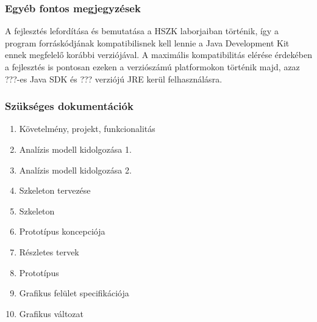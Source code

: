 %
   \subsubsection{Egyéb fontos megjegyzések}
	A fejlesztés lefordítása és bemutatása a HSZK laborjaiban történik, így a program forráskódjának kompatibilisnek kell lennie a Java Development Kit ennek megfelelő korábbi verziójával. A maximális kompatibilitás elérése érdekében a fejlesztés is pontosan ezeken a verziószámú platformokon történik majd, azaz ???-es Java SDK és ??? verziójú JRE kerül felhasználásra.

    \subsubsection{Szükséges dokumentációk}
	\begin{enumerate}
	\item Követelmény, projekt, funkcionalitás
	\item Analízis modell kidolgozása 1.
	\item Analízis modell kidolgozása 2.
	\item Szkeleton tervezése
	\item Szkeleton
	\item Prototípus koncepciója
	\item Részletes tervek
	\item Prototípus
	\item Grafikus felület specifikációja
	\item Grafikus változat
	\end{enumerate}
 
